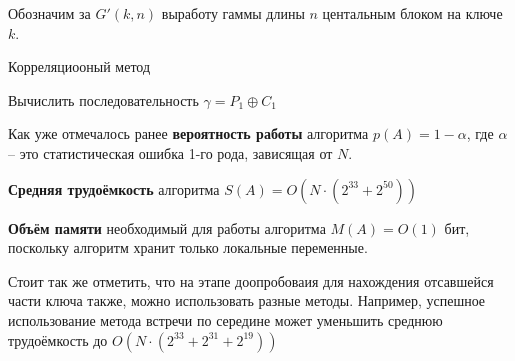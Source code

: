 \documentclass[a4paper,12pt]{article}
\theoremstyle{definition}
\begin{document}
	Обозначим за $G'(k, n)$ выработу гаммы длины $n$ центальным блоком на ключе $k$.
	
		\begin{algorithm}[H]
		
		\caption{Корреляциооный метод}
		\label{alg:Corr}
		\SetAlgoNoEnd
		
		
		Вычислить последовательность $\gamma = P_1 \oplus C_1$
		
	\end{algorithm}	
	
	Как уже отмечалось ранее \textbf{вероятность работы} алгоритма $p(A)=1-\alpha$, где $\alpha$ -- это статистическая ошибка 1-го рода, зависящая от $N$. 
	
	\textbf{Средняя трудоёмкость} алгоритма $S(A)=O\left(N\cdot\left( 2^{33} + 2^{50} \right) \right) $
		
	\textbf{Объём памяти} необходимый для работы алгоритма $M(A) = O(1)$ бит, поскольку алгоритм хранит только локальные переменные.
	
	Стоит так же отметить, что на этапе доопробоваия для нахождения отсавшейся части ключа также, можно использовать разные методы. Например, успешное использование метода встречи по середине может уменьшить среднюю трудоёмкость до $O\left(N\cdot\left( 2^{33} + 2^{31} + 2^{19} \right) \right)$
	
			
\end{document}
